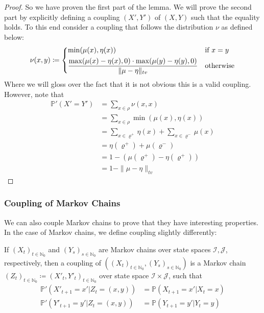\begin{proof}
		So we have proven the first part of the lemma. We will prove the second part by 
		explicitly defining a coupling $(X', Y')$ of $(X,Y)$ such that the equality holds.
		To this end consider a coupling that follows the distribution $\nu$ as defined below:
		$$
			\nu(x,y) \coloneqq 
			\begin{dcases}
				\min(\mu(x), \eta(x)) & \text{if $x=y$}\\
				\frac{\max(\mu(x)-\eta(x),0)\cdot\max(\mu(y)-\eta(y), 0)}
				{\|\mu - \eta\|_{tv}} & \text{otherwise}
			\end{dcases}
		$$
		Where we will gloss over the fact that it is not obvious this is a valid coupling.
		However, note that
		\begin{align*}
			\mathbb{P}'(X' = Y') &= \sum_{x \in \rho} \nu(x,x) \\
			&= \sum_{x \in \rho} \min(\mu(x), \eta(x)) \\
			&= \sum_{x \in \varrho^+} \eta(x) + \sum_{x \in \varrho^-} \mu(x) \\
			&= \eta(\varrho^+) + \mu(\varrho^-) \\
			&= 1 - (\mu(\varrho^+)-\eta(\varrho^+)) \\
			&= 1 - \|\mu - \eta\|_{tv}
		\end{align*}
	\end{proof}

	\subsubsection{Coupling of Markov Chains}
	We can also couple Markov chains to prove that they have interesting properties. In the 
	case of Markov chains, we define coupling slightly differently:
	\begin{definition}
		If $(X_t)_{t \in \mathbb{N}_0}$ and $(Y_s)_{s \in \mathbb{N}_0}$ are Markov chains
		over state spaces $\mathcal{I}, \mathcal{J}$, respectively, then a coupling of 
		$((X_t)_{t\in \mathbb{N}_0},(Y_s)_{s\in \mathbb{N}_0})$ is a Markov chain 
		$(Z_t)_{t \in \mathbb{N}_0} \coloneqq (X'_t, Y'_t)_{t \in \mathbb{N}_0}$ over state 
		space $\mathcal{I}\times\mathcal{J}$, such that
		\begin{align*}
			\mathbb{P}'(X'_{t+1} = x' | Z_t = (x,y))&=\mathbb{P}(X_{t+1}=x'|X_t=x) \\
			\mathbb{P}'(Y'_{t+1} = y' | Z_t = (x,y))&=\mathbb{P}(Y_{t+1}=y'|Y_t=y) 
		\end{align*}
	\end{definition}


